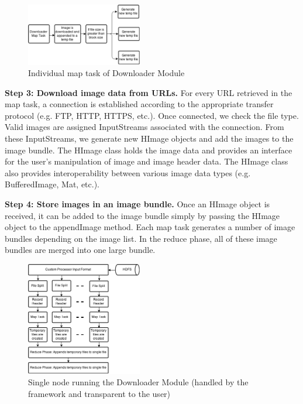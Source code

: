 \documentclass[conference]{IEEEtran}
\begin{document}
\begin{figure}[h]
	\centering
	\includegraphics[width=0.45\textwidth]{down-map}
	\caption{Individual map task of Downloader Module}
	\label{fig:down-map}
\end{figure}

\textbf{Step 3: Download image data from URLs.}  For every URL
retrieved in the map task, a connection is established according to
the appropriate transfer protocol (e.g. FTP, HTTP, HTTPS, etc.). Once
connected, we check the file type.  Valid images are assigned
InputStreams associated with the connection. From these InputStreams,
we generate new HImage objects and add the images to the image
bundle. The HImage class holds the image data and provides an
interface for the user's manipulation of image and image header
data. The HImage class also provides interoperability between various
image data types (e.g. BufferedImage, Mat, etc.).

\textbf{ Step 4: Store images in an image bundle. }  Once an HImage
object is received, it can be added to the image bundle simply by
passing the HImage object to the appendImage method. Each map task
generates a number of image bundles depending on the image list. In
the reduce phase, all of these image bundles are merged into one large
bundle.

\begin{figure}[h]
	\centering
	\includegraphics[width=0.45\textwidth]{down-node}
	\caption{Single node running the Downloader Module (handled by
          the framework and transparent to the user)}
	\label{fig:down-node}
\end{figure}
\end{document}

